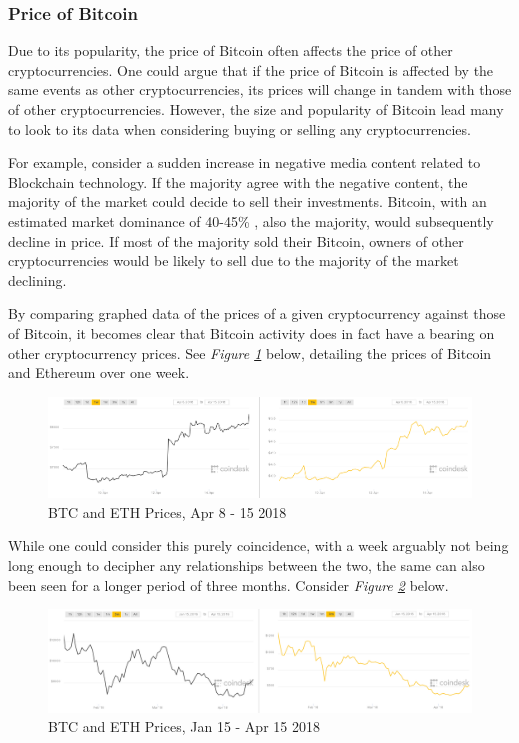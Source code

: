 \subsubsection{Price of Bitcoin}
Due to its popularity, the price of Bitcoin often affects the price of other cryptocurrencies. One could argue that if the price of Bitcoin is affected by the same events as other cryptocurrencies, its prices will change in tandem with those of other cryptocurrencies. However, the size and popularity of Bitcoin lead many to look to its data when considering buying or selling any cryptocurrencies. 

For example, consider a sudden increase in negative media content related to Blockchain technology. If the majority agree with the negative content, the majority of the market could decide to sell their investments. Bitcoin, with an estimated market dominance of 40-45\% \cite{coinmarketcap}, also the majority, would subsequently decline in price. If most of the majority sold their Bitcoin, owners of other cryptocurrencies would be likely to sell due to the majority of the market declining.   

By comparing graphed data of the prices of a given cryptocurrency against those of Bitcoin, it becomes clear that Bitcoin activity does in fact have a bearing on other cryptocurrency prices. See \textit{Figure \ref{prices1w}} below, detailing the prices of Bitcoin and Ethereum over one week.

\begin{figure}[h]
    \centering
    \includegraphics[width=\textwidth, keepaspectratio]{pricecharts/btceth1W.png}
    \caption{BTC and ETH Prices, Apr 8 - 15 2018 \cite{coindeskprices}}
    \label{prices1w}
\end{figure}    

While one could consider this purely coincidence, with a week arguably not being long enough to decipher any relationships between the two, the same can also been seen for a longer period of three months. Consider \textit{Figure \ref{prices3m}} below.

\newpage

\begin{figure}[h]
    \centering
    \includegraphics[width=\textwidth, keepaspectratio]{pricecharts/btceth3M.png}
    \caption{BTC and ETH Prices, Jan 15 - Apr 15 2018 \cite{coindeskprices}}
    \label{prices3m}
\end{figure}

